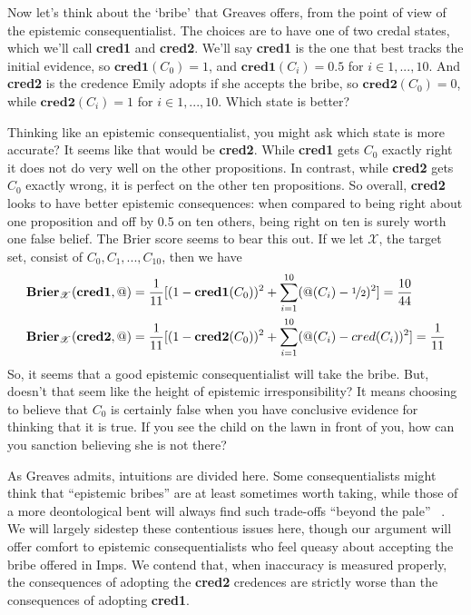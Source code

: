 Now let's think about the `bribe' that Greaves offers, from the point of view of the epistemic consequentialist. The choices are to have one of two credal states, which we'll call \textbf{cred1} and \textbf{cred2}. We'll say \textbf{cred1} is the one that best tracks the initial evidence, so $\mathbf{cred1}(C_0) = 1$, and $\mathbf{cred1}(C_i) = 0.5$ for $i \in {1, ..., 10}$. And \textbf{cred2} is the credence Emily adopts if she accepts the bribe, so $\mathbf{cred2}(C_0) = 0$, while $\mathbf{cred2}(C_i) = 1$ for $i \in {1, ..., 10}$. Which state is better?

Thinking like an epistemic consequentialist, you might ask which state is more accurate? It seems like that would be \textbf{cred2}. While \textbf{cred1} gets $C_0$ exactly right it does not do very well on the other propositions. In contrast, while \textbf{cred2} gets $C_0$ exactly wrong, it is perfect on the other ten propositions. So overall, \textbf{cred2} looks to have better epistemic consequences: when compared to being right about one proposition and off by 0.5 on ten others, being right on ten is surely worth one false belief. The Brier score seems to bear this out. If we let $\mathscr{X}$, the target set, consist of $C_0, C_1, ..., C_{10}$, then we have
\begin{align*}
\mathbf{Brier}_\mathscr{X}(\mathbf{cred1}, @) &= \frac{1}{11}[(1-\mathbf{cred1}(C_0))^2 + \sum_{i = 1}^{10} (@(C_i) - \nicefrac{1}{2}) ^2] = \frac{10}{44} \\
\mathbf{Brier}_\mathscr{X}(\mathbf{cred2}, @) &= \frac{1}{11}[(1-\mathbf{cred2}(C_0))^2 + \sum_{i = 1}^{10} (@(C_i) - cred(C_i)) ^2] = \frac{1}{11} 
\end{align*}
So, it seems that a good epistemic consequentialist will take the bribe. But, doesn’t that seem like the height of epistemic irresponsibility? It means choosing to believe that $C_0$ is certainly false when you have conclusive evidence for thinking that it is true. If you see the child on the lawn in front of you, how can you sanction believing she is not there?

As Greaves admits, intuitions are divided here. Some consequentialists might think that ``epistemic bribes'' are at least sometimes worth taking, while those of a more deontological bent will always find such trade-offs ``beyond the pale'' ~\citep[363]{Berker2013b}. We will largely sidestep these contentious issues here, though our argument will offer comfort to epistemic consequentialists who feel queasy about accepting the bribe offered in Imps. We contend that, when inaccuracy is measured properly, the consequences of adopting the \textbf{cred2} credences are strictly worse than the consequences of adopting \textbf{cred1}.

